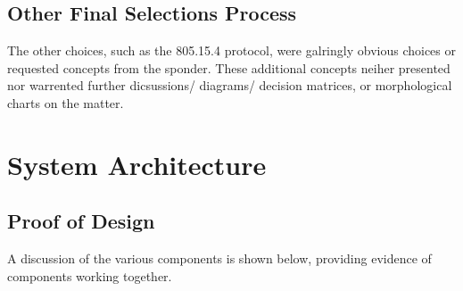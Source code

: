 \documentclass[12pt]{article}
\begin{document}
{{{		\subsection{Other Final Selections Process}
		The other choices, such as the 805.15.4 protocol, were galringly obvious choices or requested concepts from the sponder. These additional concepts neiher presented nor warrented further dicsussions/ diagrams/ decision matrices, or morphological charts on the matter. 
		
		\newpage
		
		
	\section{System Architecture}
	
		\subsection{Proof of Design}
		A discussion of the various components is shown below, providing evidence of components working together.
		
}}}
\end{document}
